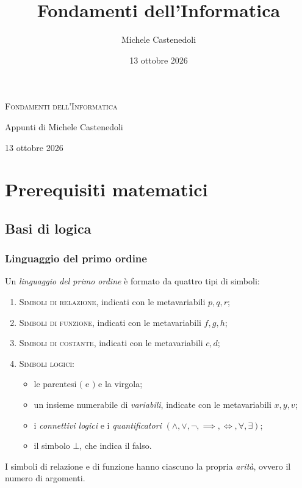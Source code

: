 \documentclass[a4paper, 11pt, oneside]{book}
\title{Fondamenti dell'Informatica}
\author{Michele Castenedoli}
\date{13 ottobre 2026}
\theoremstyle{formale}
\begin{document}
    \begin{titlepage}
        \centering
        \vspace*{0.3\textheight}
        {\LARGE\scshape Fondamenti dell'Informatica\par}
        \vspace{1em}
        {\large Appunti di Michele Castenedoli\par}
        \vfill
        {13 ottobre 2026\par}
    \end{titlepage}

    \frontmatter
    \tableofcontents

    \mainmatter
    \setcounter{chapter}{-1}%
    \chapter{Prerequisiti matematici}
    \section{Basi di logica}
    \subsection{Linguaggio del primo ordine}
    Un \emph{linguaggio del primo ordine} \`e formato da quattro tipi di simboli:
    \begin{enumerate}
        \item \textsc{Simboli di relazione}, indicati con le metavariabili $p, q, r$;
        \item \textsc{Simboli di funzione}, indicati con le metavariabili $f, g, h$;
        \item \textsc{Simboli di costante}, indicati con le metavariabili $c, d$;
        \item \textsc{Simboli logici}:
            \begin{itemize}
                \item le parentesi $($ e $)$ e la virgola;
                \item un insieme numerabile di \emph{variabili}, indicate con le
                    metavariabili $x, y, v$;
                \item i \emph{connettivi logici} e i \emph{quantificatori}
                    $(\land, \lor, \lnot, \implies, \iff, \forall, \exists)$;
                \item il simbolo $\bot$, che indica il falso.
            \end{itemize}
    \end{enumerate}
    I simboli di relazione e di funzione hanno ciascuno la propria \emph{arit\`a}, ovvero
    il numero di argomenti.
\end{document}
